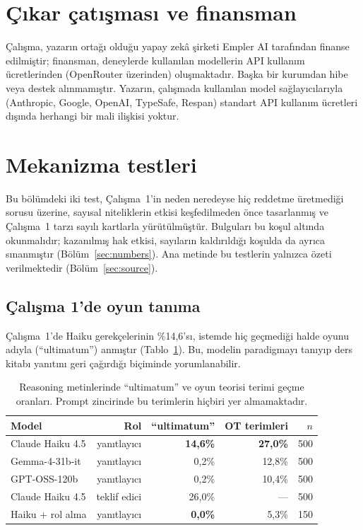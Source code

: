 \documentclass[11pt]{article}
\begin{document}
\section*{Çıkar çatışması ve finansman}

Çalışma, yazarın ortağı olduğu yapay zekâ şirketi Empler AI tarafından finanse edilmiştir; finansman, deneylerde kullanılan modellerin API kullanım ücretlerinden (OpenRouter üzerinden) oluşmaktadır. Başka bir kurumdan hibe veya destek alınmamıştır. Yazarın, çalışmada kullanılan model sağlayıcılarıyla (Anthropic, Google, OpenAI, TypeSafe, Respan) standart API kullanım ücretleri dışında herhangi bir mali ilişkisi yoktur.


\appendix

\section{Mekanizma testleri}\label{sec:mechanism}

Bu bölümdeki iki test, Çalışma~1'in neden neredeyse hiç reddetme üretmediği sorusu üzerine, sayısal niteliklerin etkisi keşfedilmeden önce tasarlanmış ve Çalışma~1 tarzı sayılı kartlarla yürütülmüştür. Bulguları bu koşul altında okunmalıdır; kazanılmış hak etkisi, sayıların kaldırıldığı koşulda da ayrıca sınanmıştır (Bölüm~\ref{sec:numbers}). Ana metinde bu testlerin yalnızca özeti verilmektedir (Bölüm~\ref{sec:source}).

\subsection{Çalışma 1'de oyun tanıma}

Çalışma~1'de Haiku gerekçelerinin \%14,6'sı, istemde hiç geçmediği halde oyunu adıyla (``ultimatum'') anmıştır (Tablo~\ref{tab:gamerecog}). Bu, modelin paradigmayı tanıyıp ders kitabı yanıtını geri çağırdığı biçiminde yorumlanabilir.

\begin{table}[H]
\centering
\caption{Reasoning metinlerinde ``ultimatum'' ve oyun teorisi terimi geçme oranları. Prompt zincirinde bu terimlerin hiçbiri yer almamaktadır.}
\label{tab:gamerecog}
\begin{tabular}{lrrrr}
\toprule
Model & Rol & ``ultimatum'' & OT terimleri & $n$ \\
\midrule
Claude Haiku 4.5 & yanıtlayıcı & \textbf{14,6\%} & \textbf{27,0\%} & 500 \\
Gemma-4-31b-it   & yanıtlayıcı & 0,2\%           & 12,8\%           & 500 \\
GPT-OSS-120b     & yanıtlayıcı & 0,2\%           & 10,4\%           & 500 \\
\midrule
Claude Haiku 4.5 & teklif edici & 26,0\%          & ---              & 500 \\
\midrule
Haiku + rol alma & yanıtlayıcı & \textbf{0,0\%}  & 5,3\%            & 150 \\
\bottomrule
\end{tabular}
\end{table}
\end{document}
